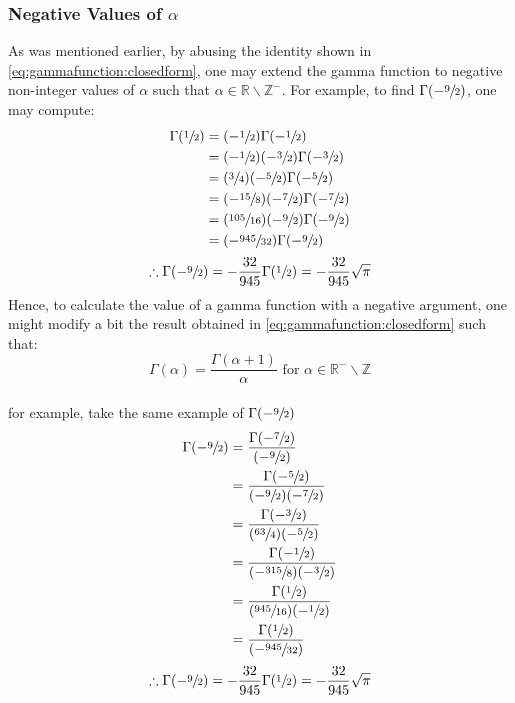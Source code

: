 \documentclass[12pt]{article}
\begin{document}
\subsubsection{Negative Values of $\alpha$}
As was mentioned earlier, by abusing the identity shown in \autoref{eq:gammafunction:closedform}, one may extend the
gamma function to negative non-integer values of $\alpha$ such that $\alpha\in\mathbb{R}\backslash\mathbb{Z}^-$. For
example, to find $\Gamma(-\sfrac{9}{2})$, one may compute:
\vspace*{-12pt}
\begin{equation}
	\begin{split}
		\Gamma(\sfrac{1}{2})	&=	(-\sfrac{1}{2})\Gamma(-\sfrac{1}{2})\\
								&=	(-\sfrac{1}{2})(-\sfrac{3}{2})\Gamma(-\sfrac{3}{2})\\
								&=	(\sfrac{3}{4})(-\sfrac{5}{2})\Gamma(-\sfrac{5}{2})\\
								&=	(-\sfrac{15}{8})(-\sfrac{7}{2})\Gamma(-\sfrac{7}{2})\\
								&=	(\sfrac{105}{16})(-\sfrac{9}{2})\Gamma(-\sfrac{9}{2})\\
								&=	(-\sfrac{945}{32})\Gamma(-\sfrac{9}{2})\\
	\end{split}
\end{equation}
\begin{equation}
	\therefore\Gamma(-\sfrac{9}{2})=-\frac{32}{945}\Gamma(\sfrac{1}{2})=-\frac{32}{945}\sqrt{\pi}
\end{equation}
Hence, to calculate the value of a gamma function with a negative argument, one might modify a bit the result obtained
in \autoref{eq:gammafunction:closedform} such that:
\vspace*{-12pt}
\begin{equation}
	\Gamma(\alpha)=\frac{\Gamma(\alpha+1)}{\alpha}\text{ for }\alpha\in\mathbb{R}^-\backslash\mathbb{Z}
\end{equation}\\[-36pt]
for example, take the same example of $\Gamma(-\sfrac{9}{2})$\\[-12pt]
\begin{equation}
	\begin{split}
		\Gamma(-\sfrac{9}{2})	&=	\frac{\Gamma(-\sfrac{7}{2})}{(-\sfrac{9}{2})}\\
								&=	\frac{\Gamma(-\sfrac{5}{2})}{(-\sfrac{9}{2})(-\sfrac{7}{2})}\\
								&=	\frac{\Gamma(-\sfrac{3}{2})}{(\sfrac{63}{4})(-\sfrac{5}{2})}\\
								&=	\frac{\Gamma(-\sfrac{1}{2})}{(-\sfrac{315}{8})(-\sfrac{3}{2})}\\
								&=	\frac{\Gamma(\sfrac{1}{2})}{(\sfrac{945}{16})(-\sfrac{1}{2})}\\
								&=	\frac{\Gamma(\sfrac{1}{2})}{(-\sfrac{945}{32})}
		\end{split}
\end{equation}
\begin{equation}
	\therefore\Gamma(-\sfrac{9}{2})=-\frac{32}{945}\Gamma(\sfrac{1}{2})=-\frac{32}{945}\sqrt{\pi}
\end{equation}
\end{document}

